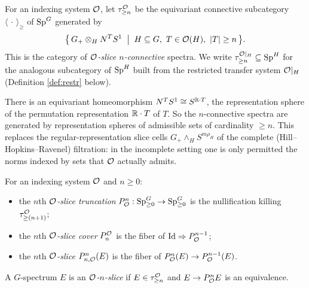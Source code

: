 \begin{qfivedefinition}
For an indexing system $\mathcal{O}$, let $\tau^{\mathcal{O}}_{\ge n}$ be the equivariant
connective subcategory $\langle\,\cdot\,\rangle_{\ge}$ of $\mathrm{Sp}^G$ generated by
\[
\bigl\{\, G_+\otimes_H N^T S^1 \;\bigm|\; H\subseteq G,\ T\in\mathcal{O}(H),\ |T|\ge n \,\bigr\}.
\]
This is the category of \emph{$\mathcal{O}$-slice $n$-connective} spectra. We write
$\tau^{\mathcal{O}|_H}_{\ge n}\subseteq \mathrm{Sp}^H$ for the analogous subcategory of
$\mathrm{Sp}^H$ built from the restricted transfer system $\mathcal{O}|_H$ (Definition
\ref{def:restr} below).
\end{qfivedefinition}

\begin{qfiveremark}
There is an equivariant homeomorphism $N^T S^1\cong S^{\mathbb{R}\cdot T}$, the
representation sphere of the permutation representation $\mathbb{R}\cdot T$ of $T$. So the
$n$-connective spectra are generated by representation spheres of admissible
sets of cardinality $\ge n$. This replaces the regular-representation slice cells
$G_+\wedge_H S^{m\rho_H}$ of the complete (Hill--Hopkins--Ravenel) filtration:
in the incomplete setting one is only permitted the norms indexed by sets that
$\mathcal{O}$ actually admits.
\end{qfiveremark}

\begin{qfivedefinition}
For an indexing system $\mathcal{O}$ and $n\ge 0$:
\begin{itemize}\setlength\itemsep{2pt}
\item the $n$th \emph{$\mathcal{O}$-slice truncation} $P^n_{\mathcal{O}}:\mathrm{Sp}^G_{\ge 0}\to
\mathrm{Sp}^G_{\ge 0}$ is the nullification killing $\tau^{\mathcal{O}}_{\ge(n+1)}$;
\item the $n$th \emph{$\mathcal{O}$-slice cover} $P^{\mathcal{O}}_n$ is the fiber of
$\mathrm{Id}\Rightarrow P^{n-1}_{\mathcal{O}}$;
\item the $n$th \emph{$\mathcal{O}$-slice} $P^n_{n,\mathcal{O}}(E)$ is the fiber of
$P^n_{\mathcal{O}}(E)\to P^{n-1}_{\mathcal{O}}(E)$.
\end{itemize}
A $G$-spectrum $E$ is an \emph{$\mathcal{O}$-$n$-slice} if $E\in\tau^{\mathcal{O}}_{\ge n}$ and
$E\to P^n_{\mathcal{O}} E$ is an equivalence.
\end{qfivedefinition}

